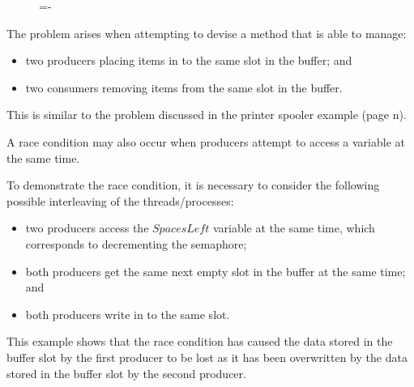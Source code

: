 \documentclass[a4paper]{systems-software}
\begin{document}
\begin{figure}[H]
  \lineskip=-\fboxrule
\end{figure}

The problem arises when attempting to devise a method that is able to manage:
\begin{itemize}
	\item two producers placing items in to the same slot in the buffer; and
	\item two consumers removing items from the same slot in the buffer.
\end{itemize}
This is similar to the problem discussed in the printer spooler example (page n).

A race condition may also occur when producers attempt to access a variable at the same time.

To demonstrate the race condition, it is necessary to consider the following possible interleaving of the threads/processes:
\begin{itemize}
	\item two producers access the $SpacesLeft$ variable at the same time, which corresponds to decrementing the semaphore;
	\item both producers get the same next empty slot in the buffer at the same time; and
	\item both producers write in to the same slot.
\end{itemize}

This example shows that the race condition has caused the data stored in the buffer slot by the first producer to be lost as it has been overwritten by the data stored in the buffer slot by the second producer.
\end{document}
